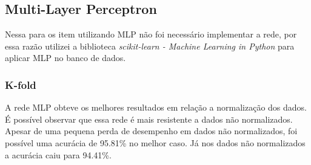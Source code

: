 \documentclass[paper=a4, fontsize=11pt]{scrartcl}
\numberwithin{equation}{section}		%
\numberwithin{figure}{section}			%
\numberwithin{table}{section}				%
\begin{document}
	\newpage
	
	\subsection{\textbf{Multi-Layer Perceptron}}
	Nessa para os item utilizando MLP não foi necessário implementar a rede, por essa razão utilizei a biblioteca \textit{scikit-learn - Machine Learning in Python} para aplicar MLP no banco de dados.
	
	
	\subsubsection{K-fold}
	
	A rede MLP obteve os melhores resultados em relação a normalização dos dados. É possível observar que essa rede é mais resistente a dados não normalizados. Apesar de uma pequena perda de desempenho em dados não normalizados, foi possível uma acurácia de 95.81\% no melhor caso. Já nos dados não normalizados a acurácia caiu para 94.41\%.
	
\end{document}
